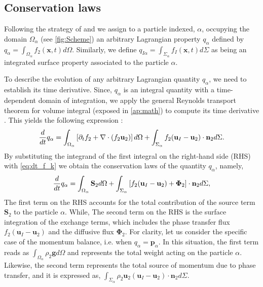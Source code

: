 \subsection{Conservation laws}
Following the strategy of \citet{zaepffel2011modelisation} and \citet[Chapter 2]{morel2015mathematical} we assign to a particle indexed, $\alpha$, occupying the domain $\Omega_\alpha$ (see \ref{fig:Scheme}) an arbitrary Lagrangian property $q_\alpha$ defined by $q_\alpha  = \int_{\Omega_\alpha} f_2(\textbf{x},t) d\Omega$.
Similarly, we define $q_{I\alpha} = \int_{\Sigma_\alpha} f_I(\textbf{x},t) d\Sigma$ as being an integrated surface property associated to the particle $\alpha$.


To describe the evolution of any arbitrary Lagrangian quantity $q_\alpha$, we need to establish its time derivative.
Since, $q_\alpha$ is an integral quantity with a time-dependent domain of integration, we apply the general Reynolds transport theorem for volume integral (exposed in \ref{ap:math}) to compute its time derivative \citep{morel2015mathematical}.
This yields the following expression :
\begin{equation}
    \frac{d}{d t}  q_\alpha
    = \int_{\Omega_\alpha}\left[ \partial_t f_2 + \mathbf{\nabla} \cdot\left(f_2\textbf{u}_2\right) \right]d\Omega\\
    + \int_{\Sigma_\alpha} f_2 (\textbf{u}_I-\textbf{u}_2)\cdot \textbf{n}_2 d\Sigma.
\end{equation}
By substituting the integrand of the first integral on the right-hand side (RHS) with \ref{eq:dt_f_k} we obtain the conservation laws of the quantity $q_\alpha$, namely,  
\begin{equation}
    \frac{d}{d t}  q_\alpha
    = \int_{\Omega_\alpha} \textbf{S}_2 d\Omega
    + \int_{\Sigma_\alpha} \left[
        f_2 (\textbf{u}_I-\textbf{u}_2) 
        + \mathbf{\Phi}_2 
        \right] \cdot \textbf{n}_2 d\Sigma,
    \label{eq:dt_q_alpha}
\end{equation}
The first term on the RHS accounts for the total contribution of the source term $\textbf{S}_2$ to the particle $\alpha$.
While, The second term on the RHS is the surface integration of the exchange terms, which includes the phase transfer flux $f_2 (\textbf{u}_I-\textbf{u}_2)$ and the diffusive flux $\mathbf{\Phi}_2$. 
For clarity, let us consider the specific case of the momentum balance, i.e. when $q_\alpha = \textbf{p}_\alpha$.
In this situation, the first term reads as $\int_{\Omega_\alpha} \rho_2\textbf{g} d\Omega$ and represents the total weight acting on the particle $\alpha$. 
Likewise, the second term represents the total source of momentum due to phase transfer, and it is expressed as, $\int_{\Sigma_\alpha} \rho_2 \textbf{u}_2 (\textbf{u}_I-\textbf{u}_2)\cdot\textbf{n}_2 d\Sigma$. 
